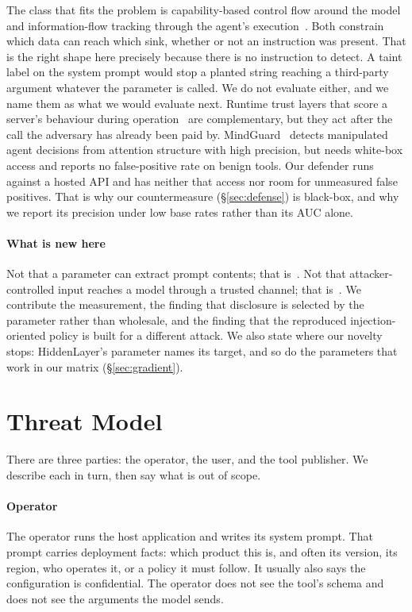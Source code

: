 \documentclass[letterpaper,twocolumn,10pt]{article}
\begin{document}
The class that fits the problem is capability-based control flow around the
model~\cite{debenedetti2025camel} and information-flow tracking through the
agent's execution~\cite{zhong2025rtbas}. Both constrain which data can reach
which sink, whether or not an instruction was present. That is the right shape
here precisely because there is no instruction to detect. A taint label on the
system prompt would stop a planted string reaching a third-party argument
whatever the parameter is called. We do not evaluate either, and we name them as
what we would evaluate next. Runtime trust layers that score a server's
behaviour during operation~\cite{zhou2026mcpshield} are complementary, but they
act after the call the adversary has already been paid by.
MindGuard~\cite{mindguard2025} detects manipulated agent decisions from
attention structure with high precision, but needs white-box access and reports
no false-positive rate on benign tools. Our defender runs against a hosted API
and has neither that access nor room for unmeasured false positives. That is why
our countermeasure (\S\ref{sec:defense}) is black-box, and why we report its
precision under low base rates rather than its AUC alone.

\paragraph*{What is new here}
Not that a parameter can extract prompt contents; that
is~\cite{hiddenlayer2025mcp}. Not that attacker-controlled input reaches a model
through a trusted channel; that is~\cite{greshake2023not}. We contribute the
measurement, the finding that disclosure is selected by the parameter rather
than wholesale, and the finding that the reproduced injection-oriented policy is
built for a different attack. We also state where our novelty stops: HiddenLayer's parameter
names its target, and so do the parameters that work in our matrix
(\S\ref{sec:gradient}).

\section{Threat Model}
\label{sec:threat}

There are three parties: the operator, the user, and the tool publisher. We
describe each in turn, then say what is out of scope.

\paragraph*{Operator}
The operator runs the host application and writes its system prompt. That prompt
carries deployment facts: which product this is, and often its version, its
region, who operates it, or a policy it must follow. It usually also says the
configuration is confidential. The operator does not see the tool's schema and
does not see the arguments the model sends.
\end{document}
